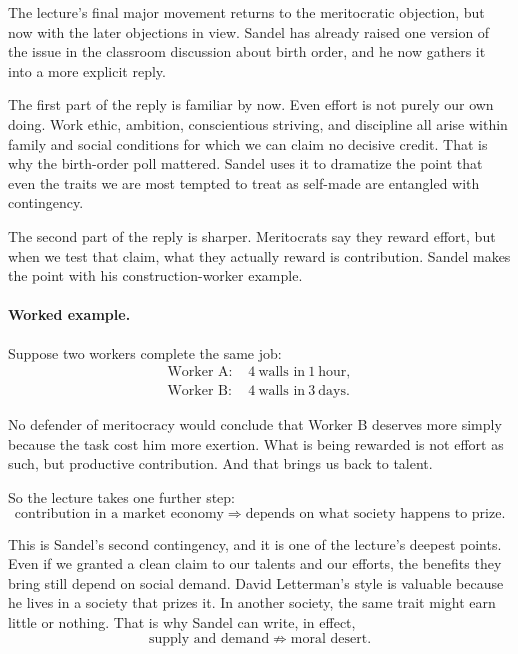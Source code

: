 The lecture's final major movement returns to the meritocratic objection, but now with the later objections in view. Sandel has already raised one version of the issue in the classroom discussion about birth order, and he now gathers it into a more explicit reply.

The first part of the reply is familiar by now. Even effort is not purely our own doing. Work ethic, ambition, conscientious striving, and discipline all arise within family and social conditions for which we can claim no decisive credit. That is why the birth-order poll mattered. Sandel uses it to dramatize the point that even the traits we are most tempted to treat as self-made are entangled with contingency.

The second part of the reply is sharper. Meritocrats say they reward effort, but when we test that claim, what they actually reward is contribution. Sandel makes the point with his construction-worker example.

\paragraph{Worked example.} Suppose two workers complete the same job:
\begin{align}
\text{Worker A: }& 4\ \text{walls in}\ 1\ \text{hour},\\
\text{Worker B: }& 4\ \text{walls in}\ 3\ \text{days}.
\end{align}

No defender of meritocracy would conclude that Worker B deserves more simply because the task cost him more exertion. What is being rewarded is not effort as such, but productive contribution. And that brings us back to talent.

So the lecture takes one further step:
\begin{equation}
\text{contribution in a market economy}
\Longrightarrow
\text{depends on what society happens to prize}.
\end{equation}

This is Sandel's second contingency, and it is one of the lecture's deepest points. Even if we granted a clean claim to our talents and our efforts, the benefits they bring still depend on social demand. David Letterman's style is valuable because he lives in a society that prizes it. In another society, the same trait might earn little or nothing. That is why Sandel can write, in effect,
\begin{equation}
\text{supply and demand}\not\Longrightarrow \text{moral desert}.
\end{equation}

